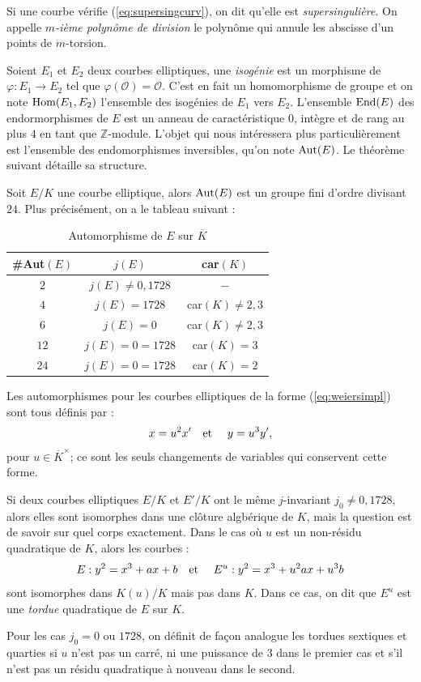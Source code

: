 \documentclass[a4paper]{article} %
\numberwithin{section}{part}
\numberwithin{equation}{section}
\newcommand\ZZ{\mathbb{Z}}
\newcommand\EO{\mathcal{O}}
\newcommand\etmath{\textup{\quad et \quad}}
\begin{document}
Si une courbe vérifie (\ref{eq:supersingcurv}), on dit qu'elle est
\emph{supersingulière}. On appelle \emph{$m$-ième polynôme de division} le
polynôme qui annule les abscisse d'un points de $m$-torsion.\par
Soient $E_1$ et $E_2$ deux courbes elliptiques, une \emph{isogénie} est un
morphisme \cite[p.12]{Sil} de $\varphi : E_1 \rightarrow E_2$ tel que 
$\varphi(\EO) = \EO$. C'est en fait un homomorphisme de groupe et on note 
$\textup{Hom}(E_1, E_2)$ l'ensemble des isogénies de $E_1$ vers $E_2$. 
L'ensemble $\textup{End}(E)$ des endormorphismes de $E$ est un anneau de 
caractéristique $0$, intègre et de rang au plus $4$ en tant que $\ZZ$-module. 
L'objet qui nous intéressera plus particulièrement est l'ensemble des 
endomorphismes inversibles, qu'on note $\textup{Aut}(E)$. Le théorème suivant 
détaille sa structure.
\begin{thm}
\label{th:autell}
Soit $E/K$ une courbe elliptique, alors $\textup{Aut}(E)$ est un groupe fini
d'ordre divisant $24$. Plus précisément, on a le tableau suivant :

\begin{table}[H]
\centering
\begin{tabular}{|c|c|c|}
    \hline
    \#Aut$(E)$ & $j(E)$ & car$(K)$\\
    \hline\hline
    $2$ & $j(E)\neq0,1728$ & $-$\\
    \hline
    $4$ & $j(E) = 1728$ & car$(K)\neq 2, 3$\\
    \hline
    $6$ & $j(E) = 0$ & car$(K)\neq 2, 3$\\
    \hline
    $12$ & $j(E) = 0 = 1728$ & car$(K) = 3$\\
    \hline
    $24$ & $j(E) = 0 = 1728$ & car$(K) = 2$\\
    \hline
\end{tabular}
\caption{Automorphisme de $E$ sur $\overline{K}$}
\label{tab:autoclotell}
\end{table}
\end{thm}
Les automorphismes pour les courbes elliptiques de la forme
(\ref{eq:weiersimpl}) sont tous définis par : 
\begin{equation}
x = u^2x'\etmath y = u^3y',
\end{equation}
pour $u\in\overline{K}^{\times}$; ce sont les seuls changements de variables qui
conservent cette forme.\par
Si deux courbes elliptiques $E/K$ et $E'/K$ ont le même $j$-invariant $j_0\neq0,
1728$, alors elles sont isomorphes dans une clôture algbérique de $K$, mais la 
question est de savoir sur quel corps exactement. Dans le cas où $u$ est un 
non-résidu quadratique de $K$, alors les courbes :
\begin{equation}
E : y^2 = x^3 + ax + b \etmath E^u : y^2 = x^3 + u^2ax + u^3b
\end{equation}
sont isomorphes dans $K(u)/K$ mais pas dans $K$. Dans ce cas, on dit que $E^u$
est une \emph{tordue} quadratique de $E$ sur $K$.\par
Pour les cas $j_0 = 0$ ou $1728$, on définit de façon analogue les tordues
sextiques et quarties si $u$ n'est pas un carré, ni une puissance de $3$ dans le
premier cas et s'il n'est pas un résidu quadratique à nouveau dans le second.
\end{document}
